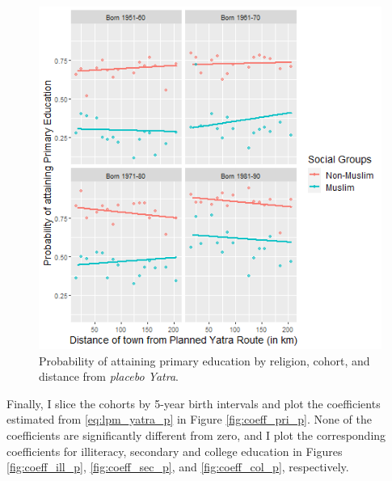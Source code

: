 \documentclass{article}
\begin{document}
\begin{figure}[H]
    \centering
    \includegraphics[scale = 0.7]{images/graph_li_pri_mus_p.png}
    \caption{Probability of attaining primary education by religion, cohort, and distance from \textit{placebo Yatra}.}
    \label{fig:li_pri_mus_p}
\end{figure}

Finally, I slice the cohorts by 5-year birth intervals and plot the coefficients estimated from \eqref{eq:lpm_yatra_p} in Figure \ref{fig:coeff_pri_p}. None of the coefficients are significantly different from zero, and I plot the corresponding coefficients for illiteracy, secondary and college education in Figures \ref{fig:coeff_ill_p}, \ref{fig:coeff_sec_p}, and \ref{fig:coeff_col_p}, respectively.
\end{document}

